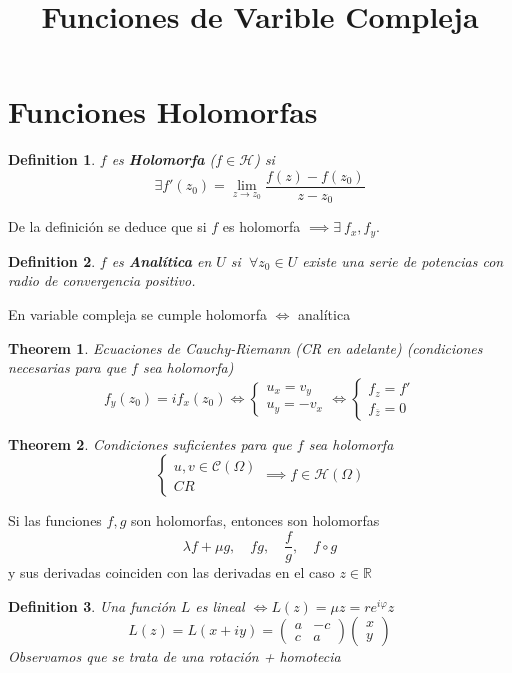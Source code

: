 \documentclass{myclass} \usepackage{verbatim}
\title{Funciones de Varible Compleja}
\newtheorem*{definition}{Definition}
\newtheorem*{theorem}{Theorem}
\begin{document}
\maketitle
\tableofcontents
\newpage

\section{Funciones Holomorfas}
\begin{definition}
$f$ es \textbf{Holomorfa} ($f\in \mathcal{H}$) si
\[
\exists f'(z_0) = \lim_{z\to z_0} \frac{f(z)-f(z_0)}{z-z_0}
\] 
\end{definition}

De la definición se deduce que si $f$ es holomorfa  $\implies \exists \ f_x, f_y$.

\begin{definition}
$f$ es  \textbf{Analítica} en $U$ si  $\ \forall z_0\in U$ existe una serie de potencias con radio de convergencia positivo.
\end{definition}

En variable compleja se cumple holomorfa  $\iff$ analítica

\begin{theorem}
Ecuaciones de Cauchy-Riemann (CR en adelante) (condiciones necesarias para que $f$ sea holomorfa)
\[
f_y(z_0) = if_x(z_0) 
\iff 
\begin{cases}
u_x = v_y \\
u_y = -v_x
\end{cases}
\iff
\begin{cases}
f_z = f'\\
f_{\overline{z}} = 0
\end{cases}
\] 
\end{theorem}

\begin{theorem}
Condiciones suficientes para que $f$ sea holomorfa
\[
\begin{cases}
  u, v\in \mathcal{C}(\Omega) \\
  CR
\end{cases}
\implies
f\in \mathcal{H}(\Omega)
\] 
\end{theorem}
Si las funciones $f, g$ son holomorfas, entonces son holomorfas
\[
\lambda f+\mu g , \quad fg, \quad \frac{f}{g}, \quad f\circ g
\] 
y sus derivadas coinciden con las derivadas en el caso $z\in \mathbb{R}$

\begin{definition}
Una función $L$ es lineal $\iff L(z) = \mu z = re^{i\varphi }z$ 
\[
  L(z) = L(x + iy) = \begin{pmatrix} a & -c \\ c & a \end{pmatrix} \begin{pmatrix} x \\ y \end{pmatrix} 
\] 
Observamos que se trata de una rotación + homotecia
\end{definition}
\end{document}
